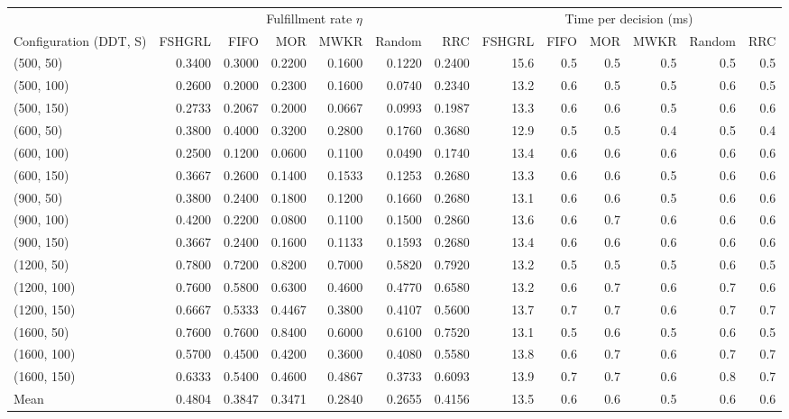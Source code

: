 \begin{tabular}{lrrrrrrrrrrrr}
\toprule
 & \multicolumn{6}{c}{Fulfillment rate $\eta$} & \multicolumn{6}{c}{Time per decision (ms)} \\
\cmidrule(lr){2-7}\cmidrule(lr){8-13}
Configuration (DDT, S) & FSHGRL & FIFO & MOR & MWKR & Random & RRC & FSHGRL & FIFO & MOR & MWKR & Random & RRC \\
\midrule
(500, 50) & 0.3400 & 0.3000 & 0.2200 & 0.1600 & 0.1220 & 0.2400 & 15.6 & 0.5 & 0.5 & 0.5 & 0.5 & 0.5 \\
(500, 100) & 0.2600 & 0.2000 & 0.2300 & 0.1600 & 0.0740 & 0.2340 & 13.2 & 0.6 & 0.5 & 0.5 & 0.6 & 0.5 \\
(500, 150) & 0.2733 & 0.2067 & 0.2000 & 0.0667 & 0.0993 & 0.1987 & 13.3 & 0.6 & 0.6 & 0.5 & 0.6 & 0.6 \\
(600, 50) & 0.3800 & 0.4000 & 0.3200 & 0.2800 & 0.1760 & 0.3680 & 12.9 & 0.5 & 0.5 & 0.4 & 0.5 & 0.4 \\
(600, 100) & 0.2500 & 0.1200 & 0.0600 & 0.1100 & 0.0490 & 0.1740 & 13.4 & 0.6 & 0.6 & 0.6 & 0.6 & 0.6 \\
(600, 150) & 0.3667 & 0.2600 & 0.1400 & 0.1533 & 0.1253 & 0.2680 & 13.3 & 0.6 & 0.6 & 0.5 & 0.6 & 0.6 \\
(900, 50) & 0.3800 & 0.2400 & 0.1800 & 0.1200 & 0.1660 & 0.2680 & 13.1 & 0.6 & 0.6 & 0.5 & 0.6 & 0.6 \\
(900, 100) & 0.4200 & 0.2200 & 0.0800 & 0.1100 & 0.1500 & 0.2860 & 13.6 & 0.6 & 0.7 & 0.6 & 0.6 & 0.6 \\
(900, 150) & 0.3667 & 0.2400 & 0.1600 & 0.1133 & 0.1593 & 0.2680 & 13.4 & 0.6 & 0.6 & 0.6 & 0.6 & 0.6 \\
(1200, 50) & 0.7800 & 0.7200 & 0.8200 & 0.7000 & 0.5820 & 0.7920 & 13.2 & 0.5 & 0.5 & 0.5 & 0.6 & 0.5 \\
(1200, 100) & 0.7600 & 0.5800 & 0.6300 & 0.4600 & 0.4770 & 0.6580 & 13.2 & 0.6 & 0.7 & 0.6 & 0.7 & 0.6 \\
(1200, 150) & 0.6667 & 0.5333 & 0.4467 & 0.3800 & 0.4107 & 0.5600 & 13.7 & 0.7 & 0.7 & 0.6 & 0.7 & 0.7 \\
(1600, 50) & 0.7600 & 0.7600 & 0.8400 & 0.6000 & 0.6100 & 0.7520 & 13.1 & 0.5 & 0.6 & 0.5 & 0.6 & 0.5 \\
(1600, 100) & 0.5700 & 0.4500 & 0.4200 & 0.3600 & 0.4080 & 0.5580 & 13.8 & 0.6 & 0.7 & 0.6 & 0.7 & 0.7 \\
(1600, 150) & 0.6333 & 0.5400 & 0.4600 & 0.4867 & 0.3733 & 0.6093 & 13.9 & 0.7 & 0.7 & 0.6 & 0.8 & 0.7 \\
Mean & 0.4804 & 0.3847 & 0.3471 & 0.2840 & 0.2655 & 0.4156 & 13.5 & 0.6 & 0.6 & 0.5 & 0.6 & 0.6 \\
\bottomrule
\end{tabular}
